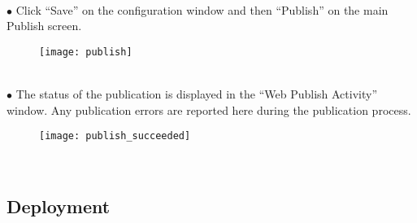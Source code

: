     \ \\
    \tab $\bullet$ Click ``Save'' on the configuration window and then ``Publish'' on the main Publish screen.
    \begin{figure}[H] 
        \centering
        \texttt{[image: publish]}
    \end{figure}
    
    \ \\
    \tab $\bullet$ The status of the publication is displayed in the ``Web Publish Activity'' window.  Any publication errors are reported here during the publication process.
    \begin{figure}[H] 
        \centering
        \texttt{[image: publish\_succeeded]}
    \end{figure}
    \ \\
\subsection{Deployment}